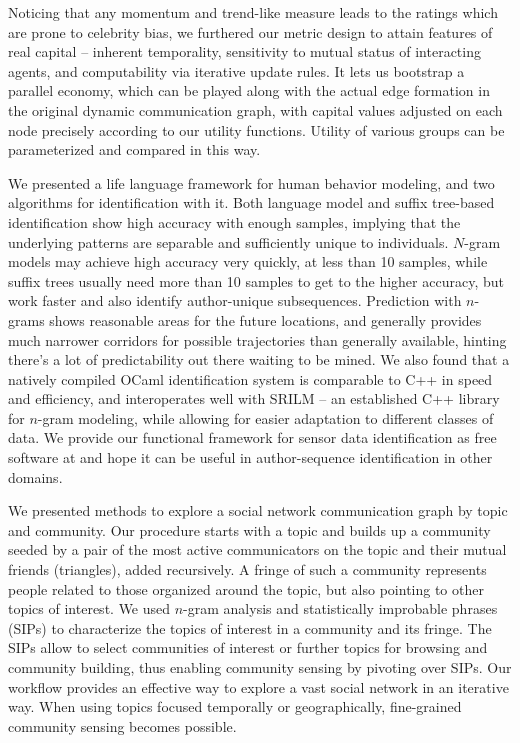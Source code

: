 \documentclass[10pt,oneside]{memoir}
\begin{document}
Noticing that any momentum and trend-like measure leads to the ratings which are prone to celebrity bias, we furthered our metric design to attain features of real capital -- inherent temporality, sensitivity to mutual status of interacting agents, and computability via iterative update rules.  It lets us bootstrap a parallel economy, which can be played along with the actual edge formation in the original dynamic communication graph, with capital values adjusted on each node precisely according to our utility functions.  Utility of various groups can be parameterized and compared in this way.


We presented a life language framework for human behavior modeling, and two algorithms for identification with it. Both language model and suffix tree-based identification show high accuracy with enough samples, implying that the underlying patterns are separable and sufficiently unique to individuals. 
$N$-gram models may achieve high accuracy very quickly, at less than 10 samples, while suffix trees usually need more than 10 samples to get to the higher accuracy, but work faster and also identify author-unique subsequences. Prediction with $n$-grams shows reasonable areas for the future locations, and generally provides much narrower corridors for possible trajectories than generally available, hinting there's a lot of predictability out there waiting to be mined. 
We also found that a natively compiled OCaml identification system is comparable to C++ in speed and efficiency, and interoperates well with SRILM -- an established C++ library for $n$-gram modeling, while allowing for easier adaptation to different classes of data. We provide our functional framework for sensor data identification as free software at \cite{Suffix:OCaml:Khrabrov,Code:LifeLang:Khrabrov} and hope it can be useful in author-sequence identification in other domains. 


We presented methods to explore a social network communication graph by topic and community. Our procedure starts with a topic and builds up a community seeded by a pair of the most active communicators on the topic and their mutual friends (triangles), added recursively. A fringe of such a community represents people related to those organized around the topic, but also pointing to other topics of interest. We used $n$-gram analysis and statistically improbable phrases (SIPs) to characterize the topics of interest in a community and its fringe. The SIPs allow to select communities of interest or further topics for browsing and community building, thus enabling community sensing by pivoting over SIPs. Our workflow provides an effective way to explore a vast social network in an iterative way. When using topics focused temporally or geographically, fine-grained community sensing becomes possible.
\end{document}
